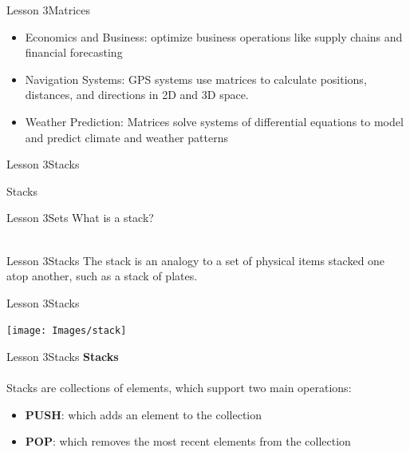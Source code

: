 \documentclass[aspectratio=1610]{beamer}
\begin{document}
\begin{frame}{Lesson 3}{Matrices}
\LARGE
\begin{itemize}
	\item Economics and Business: optimize business operations like supply chains and financial forecasting
	\item Navigation Systems: GPS systems use matrices to calculate positions, distances, and directions in 2D and 3D space.
	\item Weather Prediction: Matrices solve systems of differential equations to model and predict climate and weather patterns
\end{itemize}
\end{frame}


\begin{frame}{Lesson 3}{Stacks}
\begin{center}
\Huge Stacks
\end{center}
\end{frame}


\begin{frame}{Lesson 3}{Sets}
\Huge{What is a stack?}\\~\\
\end{frame}

\begin{frame}{Lesson 3}{Stacks}
\LARGE
The stack is an analogy to a set of physical items stacked one atop
another, such as a stack of plates.
\end{frame}

\begin{frame}{Lesson 3}{Stacks}
\begin{center}
\texttt{[image: Images/stack]}
\end{center}
\end{frame}


\begin{frame}{Lesson 3}{Stacks}
\LARGE
\textbf{Stacks}\\~\\
Stacks are collections of elements, which support two main operations:\\
\begin{itemize}
    \item \textbf{PUSH}: which adds an element to the collection 
    \item \textbf{POP}: which removes the most recent elements from the collection
\end{itemize}
\end{frame}
\end{document}
